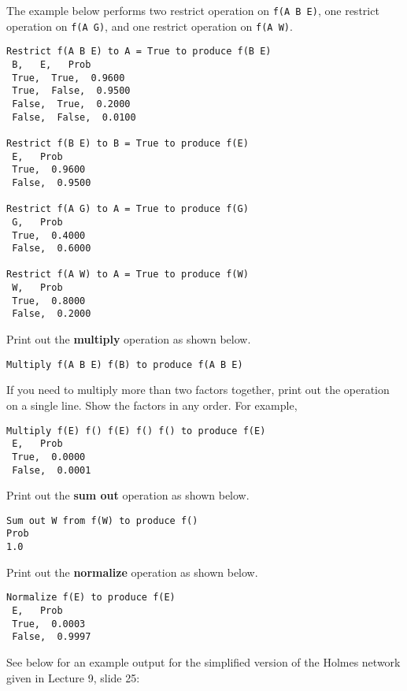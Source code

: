 \documentclass[12pt]{article}
\begin{document}
\begin{appendices}
The example below performs two restrict operation on \verb+f(A B E)+, one restrict operation on \verb+f(A G)+, and one restrict operation on \verb+f(A W)+.
%
\begin{verbatim}
Restrict f(A B E) to A = True to produce f(B E)
 B,   E,   Prob
 True,  True,  0.9600
 True,  False,  0.9500
 False,  True,  0.2000
 False,  False,  0.0100

Restrict f(B E) to B = True to produce f(E)
 E,   Prob
 True,  0.9600
 False,  0.9500

Restrict f(A G) to A = True to produce f(G)
 G,   Prob
 True,  0.4000
 False,  0.6000

Restrict f(A W) to A = True to produce f(W)
 W,   Prob
 True,  0.8000
 False,  0.2000

\end{verbatim}

Print out the {\bf multiply} operation as shown below.
%
\begin{verbatim}
Multiply f(A B E) f(B) to produce f(A B E)
\end{verbatim}

If you need to multiply more than two factors together, print out the operation on a single line. Show the factors in any order. For example,
%
\begin{verbatim}
Multiply f(E) f() f(E) f() f() to produce f(E)
 E,   Prob
 True,  0.0000
 False,  0.0001
\end{verbatim}


Print out the {\bf sum out} operation as shown below.
%
\begin{verbatim}
Sum out W from f(W) to produce f()
Prob
1.0
\end{verbatim}


Print out the {\bf normalize} operation as shown below.
%
\begin{verbatim}
Normalize f(E) to produce f(E)
 E,   Prob
 True,  0.0003
 False,  0.9997
\end{verbatim}


See below for an example output for the simplified version of the Holmes network given in Lecture 9, slide 25:


\end{appendices}
\end{document}
